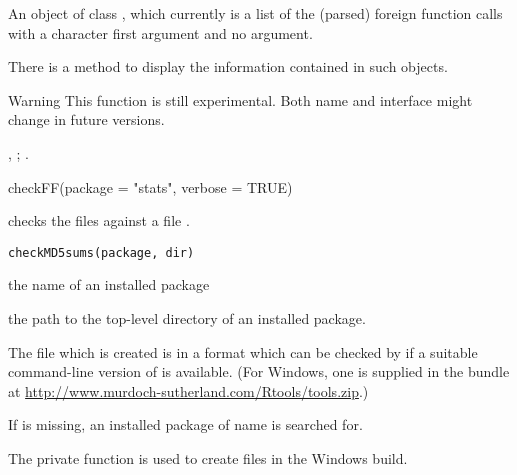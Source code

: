 %
\begin{Value}
An object of class , which currently is a list of the
(parsed) foreign function calls with a character first argument and
no  argument.

There is a  method to display the information contained in
such objects.
\end{Value}
%
\begin{Section}{Warning}
This function is still experimental.  Both name and interface might
change in future versions.
\end{Section}
%
\begin{SeeAlso}\relax
{},
;
.
\end{SeeAlso}
%
\begin{Examples}
\begin{ExampleCode}
checkFF(package = "stats", verbose = TRUE)
\end{ExampleCode}
\end{Examples}
%
\begin{Description}\relax
{} checks the files against a file .
\end{Description}
%
\begin{Usage}
\begin{verbatim}
checkMD5sums(package, dir)
\end{verbatim}
\end{Usage}
%
\begin{Arguments}
\begin{ldescription}
\item[\code{package}] the name of an installed package
\item[\code{dir}] the path to the top-level directory of an installed
package.
\end{ldescription}
\end{Arguments}
%
\begin{Details}\relax
The file  which is created is in a format which can be
checked by  if a suitable command-line version
of  is available.  (For Windows, one is supplied in
the bundle at \url{http://www.murdoch-sutherland.com/Rtools/tools.zip}.)

If  is missing, an installed package of name 
is searched for.

The private function  is used to create
 files in the Windows build.
\end{Details}
